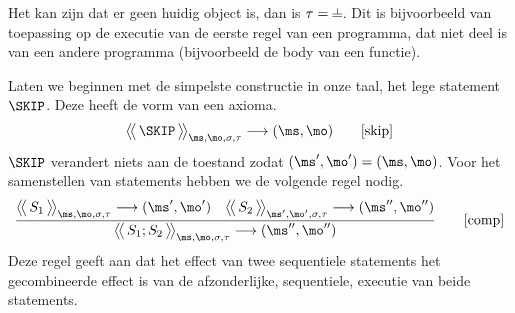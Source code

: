 Het kan zijn dat er geen huidig object is, dan is $\tau = \nil$. Dit is bijvoorbeeld van toepassing op de executie van de eerste regel van een programma, dat niet deel is van een andere programma (bijvoorbeeld de body van een functie).

Laten we beginnen met de simpelste constructie in onze taal, het lege statement $\SKIP$. Deze heeft de vorm van een axioma.
%
\begin{equation*}
  \Config{\SKIP}{\ms, \mo, \sigma, \tau}
  \longrightarrow
  (\ms, \mo)
  \tag*{[skip]}
\end{equation*}
%
$\SKIP$ verandert niets aan de toestand zodat $(\ms',\mo')=(\ms,\mo)$. Voor het samenstellen van statements hebben we de volgende regel nodig.
%
\begin{gather*}
  \frac{
    \Config{S_1}{\ms, \mo, \sigma, \tau}
    \longrightarrow
    (\ms', \mo')
  \quad
    \Config{S_2}{\ms', \mo', \sigma, \tau}
    \longrightarrow
    (\ms'', \mo'')
  }
  {
    \Config{S_1; S_2}{\ms, \mo, \sigma, \tau}
    \longrightarrow
    (\ms'', \mo'')
  }
  \tag*{[comp]}
\end{gather*}
%
Deze regel geeft aan dat het effect van twee sequentiele statements het gecombineerde effect is van de afzonderlijke, sequentiele, executie van beide statements.

